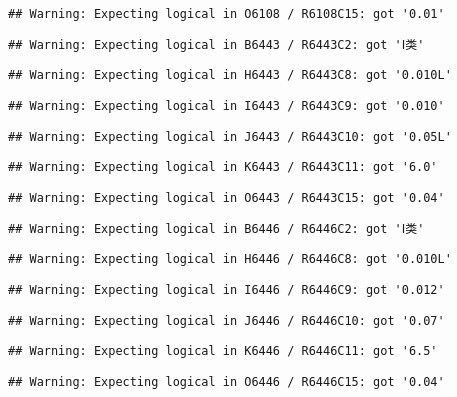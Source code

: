 \documentclass[
]{article}
\begin{document}
\begin{verbatim}
## Warning: Expecting logical in O6108 / R6108C15: got '0.01'
\end{verbatim}

\begin{verbatim}
## Warning: Expecting logical in B6443 / R6443C2: got 'Ⅰ类'
\end{verbatim}

\begin{verbatim}
## Warning: Expecting logical in H6443 / R6443C8: got '0.010L'
\end{verbatim}

\begin{verbatim}
## Warning: Expecting logical in I6443 / R6443C9: got '0.010'
\end{verbatim}

\begin{verbatim}
## Warning: Expecting logical in J6443 / R6443C10: got '0.05L'
\end{verbatim}

\begin{verbatim}
## Warning: Expecting logical in K6443 / R6443C11: got '6.0'
\end{verbatim}

\begin{verbatim}
## Warning: Expecting logical in O6443 / R6443C15: got '0.04'
\end{verbatim}

\begin{verbatim}
## Warning: Expecting logical in B6446 / R6446C2: got 'Ⅰ类'
\end{verbatim}

\begin{verbatim}
## Warning: Expecting logical in H6446 / R6446C8: got '0.010L'
\end{verbatim}

\begin{verbatim}
## Warning: Expecting logical in I6446 / R6446C9: got '0.012'
\end{verbatim}

\begin{verbatim}
## Warning: Expecting logical in J6446 / R6446C10: got '0.07'
\end{verbatim}

\begin{verbatim}
## Warning: Expecting logical in K6446 / R6446C11: got '6.5'
\end{verbatim}

\begin{verbatim}
## Warning: Expecting logical in O6446 / R6446C15: got '0.04'
\end{verbatim}
\end{document}
